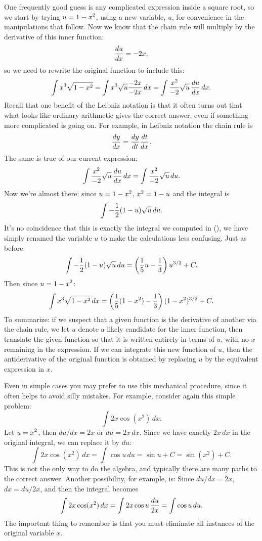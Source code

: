 One frequently good guess is any complicated expression inside a
square root, so we start by trying $\displaystyle u=1-x^2$, using a new variable,
$u$, for convenience in the manipulations that follow. Now we know
that the chain rule will multiply by the derivative of this inner
function:
$${du\over dx} = -2x,$$
so we need to rewrite the original function to include this:
$$
  \int x^3\sqrt{1-x^2}=\int x^3\sqrt{u}{-2x\over-2x}\,dx=
  \int {x^2\over-2}\sqrt{u}\,{du\over dx}\,dx.
$$ 
Recall that one benefit of the Leibniz notation is that it often turns out
that what looks like ordinary arithmetic gives the correct answer,
even if something more complicated is going on. For example, in
Leibniz notation the chain rule is
$${dy\over dx}={dy\over dt}{dt\over dx}.$$
The same is true of our current expression:
$$
  \int {x^2\over-2}\sqrt{u}\,{du\over dx}\,dx=
  \int {x^2\over-2}\sqrt{u}\,du.
$$
Now we're almost there: since $\displaystyle u=1-x^2$, $\displaystyle x^2=1-u$ and the integral is
$$\int -{1\over2}(1-u)\sqrt{u}\,du.$$
It's no coincidence that this is exactly the integral we computed in
(), 
we have simply renamed the variable $u$ to make the
calculations less confusing. Just as before:
$$
  \int-{1\over2}(1-u)\sqrt{u}\,du=
  \left({1\over5}u-{1\over3}\right)u^{3/2}+C.
$$
Then since $\displaystyle u=1-x^2$:
$$
  \int x^3\sqrt{1-x^2}\,dx=\left({1\over5}(1-x^2)-{1\over3}\right)
  (1-x^2)^{3/2}+C.
$$
To summarize: if we suspect that a given function is the derivative of
another via the chain rule, we let $u$ denote a likely candidate for
the inner function, then translate the given function so that it is
written entirely in terms of $u$, with no $x$ remaining in the
expression. If we can integrate this new function of $u$, then the
antiderivative of the original function is obtained by replacing $u$
by the equivalent expression in $x$.

Even in simple cases you may prefer to use this mechanical procedure,
since it often helps to avoid silly mistakes. For example, consider
again this simple problem:
$$\int 2x\cos(x^2)\,dx.$$
Let $\displaystyle u=x^2$, then $du/dx = 2x$ or $du = 2x\,dx$. Since we have exactly 
$2x\,dx$ in the original integral, we can replace it by $du$:
$$\int 2x\cos(x^2)\,dx=\int \cos u\,du=\sin u +C = \sin(x^2)+C.$$
This is not the only way to do the algebra, and typically there are
many paths to the correct answer. Another possibility, for example,
is: Since $du/dx = 2x$, $dx=du/2x$, and then the integral becomes
$$\int 2x\cos(x^2)\,dx=\int 2x\cos u\,{du\over 2x}=\int \cos u\,du.$$
The important thing to remember is that you must eliminate all
instances of the original variable $x$.

